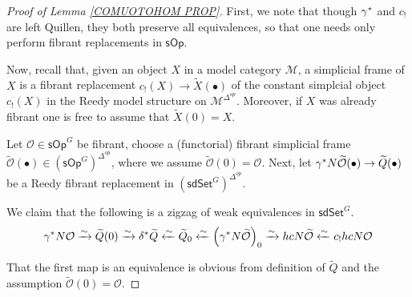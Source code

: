 \documentclass[a4paper,10pt
,draft
]{article}%
\renewcommand{\1}{\eta}%
\begin{document}
\begin{proof}[Proof of Lemma \ref{COMUOTOHOM PROP}]
      First, we note that though $\gamma^{\**}$ and $c_{!}$ are left Quillen, they both preserve all equivalences, 
      so that one needs only perform fibrant replacements in 
      $\mathsf{sOp}$.

      Now, recall that, given an object $X$ in a model category $\mathcal{M}$, a simplicial frame of $X$ is a fibrant replacement
      $c_!(X) \to \widetilde{X}(\bullet)$ of the constant 
      simplcial object $c_!(X)$ in the Reedy model structure on $\mathcal{M}^{\Delta^{op}}$.
      Moreover, if $X$ was already fibrant one is free to assume that $\widetilde{X}(0) = X$.
      
      Let $\mathcal{O} \in \mathsf{sOp}^G$ be fibrant, 
      choose a (functorial) fibrant simplicial frame
      $\widetilde{\mathcal{O}}(\bullet) \in (\mathsf{sOp}^G)^{\Delta^{op}}$, where we assume $\widetilde{\mathcal{O}} (0) = \mathcal{O}$.
      Next, let 
      $\gamma^{\**} N \widetilde{\mathcal{O}}(\bullet) 
      \to \widetilde{Q}(\bullet)$
      be a Reedy fibrant replacement in  
      $(\mathsf{sdSet}^G)^{\Delta^{op}}$.
      
      We claim that the following is a zigzag of weak equivalences in $\mathsf{sdSet}^G$.
      \begin{equation}\label{BIGZIG EQ}
            \gamma^{\**} N \mathcal{O} \xrightarrow{\sim}
            \widetilde{Q}(0) \xrightarrow{\sim}
            \delta^{\**} \widetilde{Q} \xleftarrow{\sim}
            \widetilde{Q}_0 \xleftarrow{\sim}
            \left(\gamma^{\**} N \widetilde{\mathcal{O}}\right)_0
            \xrightarrow{\sim}
            hcN \widetilde{\mathcal{O}} \xleftarrow{\sim}
            c_{!} hcN \mathcal{O}
      \end{equation}
      
      That the first map is an equivalence is obvious from definition of $\widetilde{Q}$ and the assumption $\widetilde{\mathcal{O}}(0) = \mathcal{O}$.
      

\end{proof}
\end{document}
